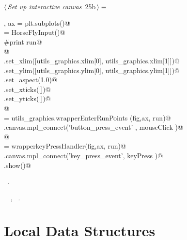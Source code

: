 \documentclass[11.5pt]{report}
\begin{document}
\begin{flushleft} \small\label{scrap20}\raggedright\small
{} $\langle\,${\itshape Set up interactive canvas}\nobreak\ {\footnotesize {25b}}$\,\rangle\equiv$
\vspace{-1ex}
\begin{list}{}{} \item
\mbox{}\verb@fig, ax =  plt.subplots()@\\
\mbox{}\verb@run = HorseFlyInput()@\\
\mbox{}\verb@#print run@\\
\mbox{}\verb@    @\\
\mbox{}\verb@ax.set_xlim([utils_graphics.xlim[0], utils_graphics.xlim[1]])@\\
\mbox{}\verb@ax.set_ylim([utils_graphics.ylim[0], utils_graphics.ylim[1]])@\\
\mbox{}\verb@ax.set_aspect(1.0)@\\
\mbox{}\verb@ax.set_xticks([])@\\
\mbox{}\verb@ax.set_yticks([])@\\
\mbox{}\verb@      @\\
\mbox{}\verb@mouseClick   = utils_graphics.wrapperEnterRunPoints (fig,ax, run)@\\
\mbox{}\verb@fig.canvas.mpl_connect('button_press_event' , mouseClick )@\\
\mbox{}\verb@      @\\
\mbox{}\verb@keyPress     = wrapperkeyPressHandler(fig,ax, run)@\\
\mbox{}\verb@fig.canvas.mpl_connect('key_press_event', keyPress   )@\\
\mbox{}\verb@plt.show()@\\
\mbox{}\verb@@{\NWsep}
\end{list}
\vspace{-1.5ex}
\footnotesize
\begin{list}{}{\setlength{\itemsep}{-\parsep}\setlength{\itemindent}{-\leftmargin}}
\item \NWtxtMacroRefIn\ .
\item \NWtxtIdentsUsed\nobreak\  \verb@HorseFlyInput@\nobreak\ , \verb@wrapperkeyPressHandler@\nobreak\ .
\item{}
\end{list}
\vspace{4ex}
\end{flushleft}
\section{Local Data Structures}
\end{document}
